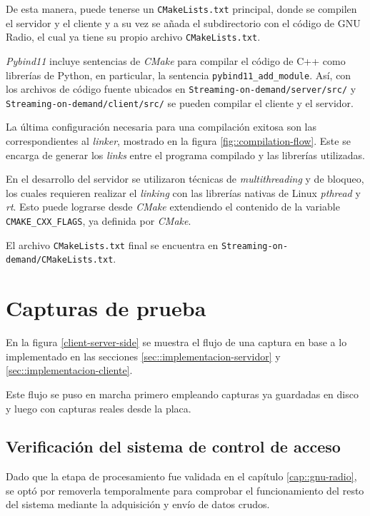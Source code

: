 \documentclass[../../main.tex]{subfiles}
\begin{document}
De esta manera, puede tenerse un \texttt{CMakeLists.txt} principal, donde se compilen el servidor y el cliente y a su vez se añada el subdirectorio con el código de GNU Radio, el cual ya tiene su propio archivo \texttt{CMakeLists.txt}.

\textit{Pybind11} incluye sentencias de \textit{CMake} para compilar el código de C++ como librerías de Python, en particular, la sentencia \texttt{pybind11\_add\_module}. Así, con los archivos de código fuente ubicados en \texttt{Streaming-on-demand/server/src/} y \texttt{Streaming-on-demand/client/src/} se pueden compilar el cliente y el servidor.

La última configuración necesaria para una compilación exitosa son las correspondientes al \textit{linker}, mostrado en la figura \ref{fig::compilation-flow}. Este se encarga de generar los \textit{links} entre el programa compilado y las librerías utilizadas.

En el desarrollo del servidor se utilizaron técnicas de \textit{multithreading} y de bloqueo, los cuales requieren realizar el \textit{linking} con las librerías nativas de Linux \textit{pthread} y \textit{rt}.  Esto puede lograrse desde \textit{CMake} extendiendo el contenido de la variable \texttt{CMAKE\_CXX\_FLAGS}, ya definida por \textit{CMake}.

El archivo \texttt{CMakeLists.txt} final se encuentra en \texttt{Streaming-on-demand/CMakeLists.txt}.


\section{Capturas de prueba}
En la figura \ref{client-server-side} se muestra el flujo de una captura en base a lo implementado en las secciones \ref{sec::implementacion-servidor} y \ref{sec::implementacion-cliente}.

Este flujo se puso en marcha primero empleando capturas ya guardadas en disco y luego con capturas reales desde la placa.

\subsection{Verificación del sistema de control de acceso}
Dado que la etapa de procesamiento fue validada en el capítulo \ref{cap::gnu-radio}, se optó por removerla temporalmente para comprobar el funcionamiento del resto del sistema mediante la adquisición y envío de datos crudos.
\end{document}
